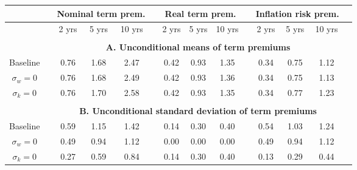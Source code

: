 \begin{tabular}{cccccccccccccc} \hline &&\multicolumn{3}{c}{Nominal term prem.}&&\multicolumn{3}{c}{Real term prem.}&&\multicolumn{3}{c}{Inflation risk prem.}\\ \hline &&2 yrs& 5 yrs& 10 yrs&&2 yrs& 5 yrs& 10 yrs&&2 yrs& 5 yrs& 10 yrs\\ \hline \\ && \multicolumn{11}{c}{\bf{A. Unconditional means of term premiums}}\\ \hline Baseline & & 0.76 & 1.68 & 2.47 &  & 0.42 & 0.93 & 1.35 &  & 0.34 & 0.75 & 1.12 \\ $\sigma_w=0$ & & 0.76 & 1.68 & 2.49 &  & 0.42 & 0.93 & 1.36 &  & 0.34 & 0.75 & 1.13 \\ $\sigma_k=0$ & & 0.76 & 1.70 & 2.58 &  & 0.42 & 0.93 & 1.35 &  & 0.34 & 0.77 & 1.23 \\  \hline \\ && \multicolumn{11}{c}{\bf{B. Unconditional standard deviation of term premiums}}\\ \hline Baseline & & 0.59 & 1.15 & 1.42 &  & 0.14 & 0.30 & 0.40 &  & 0.54 & 1.03 & 1.24 \\ $\sigma_w=0$ & & 0.49 & 0.94 & 1.12 &  & 0.00 & 0.00 & 0.00 &  & 0.49 & 0.94 & 1.12 \\ $\sigma_k=0$ & & 0.27 & 0.59 & 0.84 &  & 0.14 & 0.30 & 0.40 &  & 0.13 & 0.29 & 0.44 \\ \hline \end{tabular}
